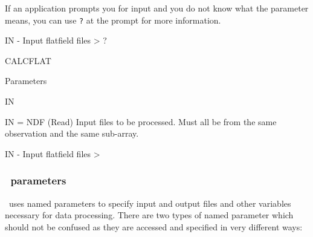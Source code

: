 \documentclass[oneside,11pt]{starlink}
\begin{document}
\begin{terminalv}
\end{terminalv}

If an application prompts you for input and you do not know what the
parameter means, you can use \verb+?+ at the prompt for more
information.

\begin{terminalv}
IN - Input flatfield files > ?

CALCFLAT

  Parameters

    IN

      IN = NDF (Read)
         Input files to be processed. Must all be from the same
         observation and the same sub-array.

IN - Input flatfield files >
\end{terminalv}

\subsubsection{\SMURF\ parameters}

\SMURF\ uses named parameters to specify input and output files and
other variables necessary for data processing. There are two types of
named parameter which should not be confused as they are accessed and
specified in very different ways:
\end{document}
